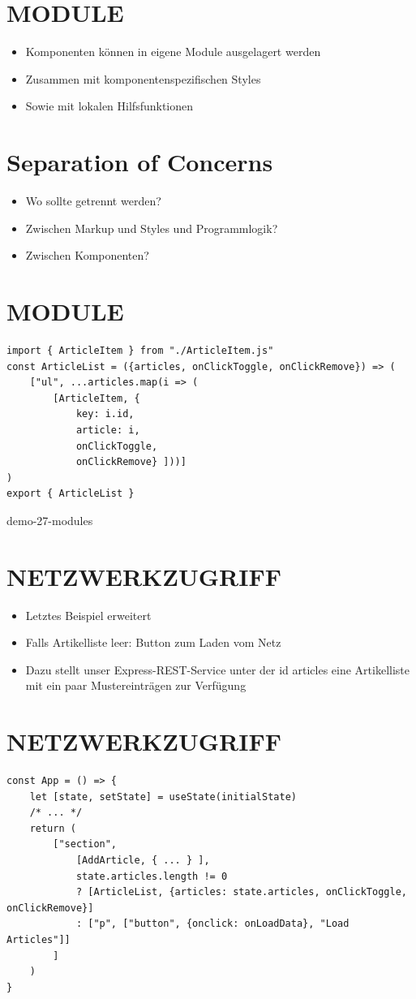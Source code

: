 \documentclass[10pt]{article}
\begin{document}
\section*{MODULE}
\begin{itemize}
  \item Komponenten können in eigene Module ausgelagert werden
  \item Zusammen mit komponentenspezifischen Styles
  \item Sowie mit lokalen Hilfsfunktionen
\end{itemize}

\section*{Separation of Concerns}
\begin{itemize}
  \item Wo sollte getrennt werden?
  \item Zwischen Markup und Styles und Programmlogik?
  \item Zwischen Komponenten?
\end{itemize}

\section*{MODULE}
\begin{verbatim}
import { ArticleItem } from "./ArticleItem.js"
const ArticleList = ({articles, onClickToggle, onClickRemove}) => (
    ["ul", ...articles.map(i => (
        [ArticleItem, {
            key: i.id,
            article: i,
            onClickToggle,
            onClickRemove} ]))]
)
export { ArticleList }
\end{verbatim}

demo-27-modules

\section*{NETZWERKZUGRIFF}
\begin{itemize}
  \item Letztes Beispiel erweitert
  \item Falls Artikelliste leer: Button zum Laden vom Netz
  \item Dazu stellt unser Express-REST-Service unter der id articles eine Artikelliste mit ein paar Mustereinträgen zur Verfügung
\end{itemize}

\section*{NETZWERKZUGRIFF}
\begin{verbatim}
const App = () => {
    let [state, setState] = useState(initialState)
    /* ... */
    return (
        ["section",
            [AddArticle, { ... } ],
            state.articles.length != 0
            ? [ArticleList, {articles: state.articles, onClickToggle, onClickRemove}]
            : ["p", ["button", {onclick: onLoadData}, "Load Articles"]]
        ]
    )
}
\end{verbatim}
\end{document}
